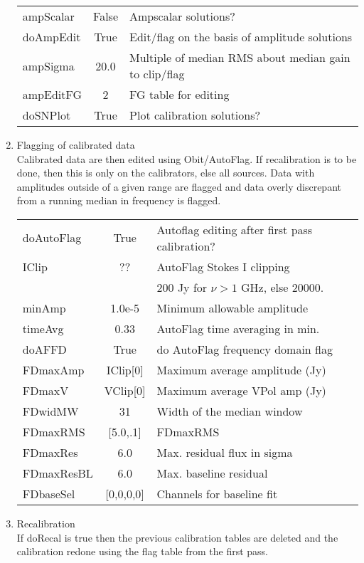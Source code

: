 \documentclass[11pt]{article}
\begin{document}
\begin{enumerate}
\begin{center}
\begin{tabular}{|l|c|l|}
ampScalar  & False &  Ampscalar solutions?\\
doAmpEdit  & True  & Edit/flag on the basis of amplitude solutions \\
ampSigma  & 20.0 &  Multiple of median RMS about median gain to clip/flag\\
ampEditFG  & 2 &  FG table for editing \\
doSNPlot       & True &  Plot calibration solutions?\\
\hline
\end{tabular}
\end{center}
\newpage
%
\item Flagging of calibrated data\\
Calibrated data are then edited using Obit/AutoFlag. 
If recalibration is to be done, then this is only on the calibrators,
else all sources.
Data with amplitudes outside of a given range are flagged and data
overly discrepant from a running median in frequency is flagged.
\begin{center}
\begin{tabular}{|l|c|l|}
\hline
doAutoFlag  & True &  Autoflag editing after first pass calibration?\\
IClip  & ?? &  AutoFlag Stokes I clipping\\
 & & 200 Jy for $\nu> 1$ GHz, else 20000. \\
minAmp  & 1.0e-5 & Minimum allowable amplitude \\
timeAvg  & 0.33 &  AutoFlag time averaging in min.\\
doAFFD  & True & do AutoFlag frequency domain flag \\
FDmaxAmp  & IClip[0] &  Maximum average amplitude (Jy)\\
FDmaxV  & VClip[0] &  Maximum average VPol amp (Jy)\\
FDwidMW  & 31 & Width of the median window \\
FDmaxRMS  & [5.0,.1] &  FDmaxRMS\\
FDmaxRes  & 6.0  &  Max. residual flux in sigma\\
FDmaxResBL  & 6.0 &  Max. baseline residual\\
FDbaseSel  & [0,0,0,0] & Channels for baseline fit \\
\hline
\end{tabular}
\end{center}
%
\item Recalibration \\
If doRecal is true then the previous calibration tables are deleted
and the calibration redone using the flag table from the first pass.

\end{enumerate}
\end{document}

